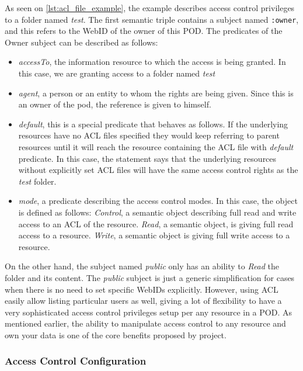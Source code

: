 As seen on \autoref{lst:acl_file_example}, the example describes access control privileges to a folder named \textit{test}. The first semantic triple contains a subject named \texttt{:owner}, and this refers to the WebID of the owner of this \solid{} POD. The predicates of the Owner subject can be described as follows:
\begin{itemize}
    \item \textit{accessTo}, the information resource to which the access is being granted. In this case, we are granting access to a folder named \textit{test}
    \item \textit{agent}, a person or an entity to whom the rights are being given. Since this is an owner of the \solid{} pod, the reference is given to himself.
    \item \textit{default}, this is a special predicate that behaves as follows. If the underlying resources have no ACL files specified they would keep referring to parent resources until it will reach the resource containing the ACL file with \textit{default} predicate. In this case, the statement says that the underlying resources without explicitly set ACL files will have the same access control rights as the \textit{test} folder.
    \item \textit{mode}, a predicate describing the access control modes. In this case, the object is defined as follows: 
        \subitem \textit{Control}, a semantic object describing full read and write access to an ACL of the resource.
        \subitem \textit{Read}, a semantic object, is giving full read access to a resource.
        \subitem \textit{Write}, a semantic object is giving full write access to a resource.
\end{itemize}

On the other hand, the subject named \textit{public} only has an ability to \textit{Read} the folder and its content. The \textit{public} subject is just a generic simplification for cases when there is no need to set specific WebIDs explicitly. However, using ACL easily allow listing particular users as well, giving a lot of flexibility to have a very sophisticated access control privileges setup per any resource in a \solid{} POD. As mentioned earlier, the ability to manipulate access control to any resource and own your data is one of the core benefits proposed by \solid{} project. 

\subsubsection{Access Control Configuration}

